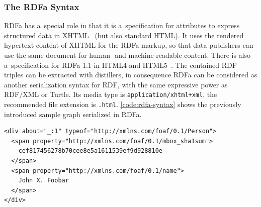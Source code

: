 \subsubsection{The RDFa Syntax}
RDFa has a~special role in that it is a~specification for attributes to express structured data
in XHTML~\cite{Adida2008} (but also standard HTML).
It uses the rendered hypertext content of XHTML for the RDFa markup,
so that data publishers can use the same document for human- and machine-readable content.
There is also a~specification for RDFa 1.1 in HTML4 and HTML5~\cite{Sporny2011}.
The contained RDF triples can be extracted with distillers,
in consequence RDFa can be considered as another serialization syntax for RDF,
with the same expressive power as RDF/XML or Turtle.
Its media type is \texttt{application/xhtml+xml}, the recommended file extension is \texttt{.html}.
\autoref{code:rdfa-syntax} shows the previously introduced sample graph serialized in RDFa.

\begin{lstlisting}[caption={A sample graph in RDFa syntax.},label={code:rdfa-syntax}]
<div about="_:1" typeof="http://xmlns.com/foaf/0.1/Person">           
  <span property="http://xmlns.com/foaf/0.1/mbox_sha1sum">
    cef817456278b70cee8e5a1611539ef9d928810e
  </span> 
  <span property="http://xmlns.com/foaf/0.1/name">
    John X. Foobar
  </span>
</div> 
\end{lstlisting}

